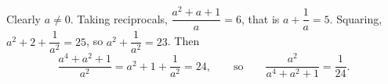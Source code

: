 Clearly $a\ne0$. Taking reciprocals, $\dfrac{a^2+a+1}{a}=6$, that is $a+\dfrac{1}{a}=5$. Squaring, $a^2+2+\dfrac{1}{a^2}=25$, so $a^2+\dfrac{1}{a^2}=23$. Then
\[\dfrac{a^4+a^2+1}{a^2}=a^2+1+\dfrac{1}{a^2}=24,\qquad\text{so}\qquad \dfrac{a^2}{a^4+a^2+1}=\boxed{\dfrac{1}{24}}.\]
